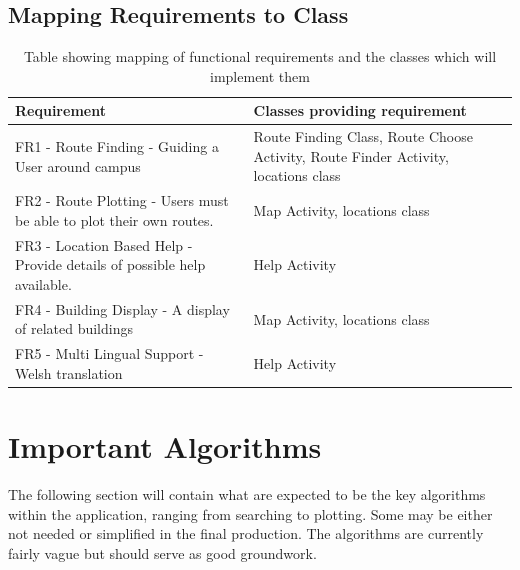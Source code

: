 \subsection{Mapping Requirements to Class}
\begin{center}
\begin{table}

    \begin{tabular}{ | p{7cm} | p{7cm} |}
    \hline
    Requirement & Classes providing requirement  \\ \hline
    FR1 - Route Finding - Guiding a User around campus & Route Finding Class, Route Choose Activity, Route Finder Activity, locations class  \\ \hline
    FR2 - Route Plotting - Users must be able to plot their own routes.& Map Activity, locations class  \\ \hline
   FR3 - Location Based Help - Provide details of possible help available. & Help Activity  \\ \hline
   FR4 - Building Display - A display of related buildings & Map Activity, locations class \\ \hline
   FR5 - Multi Lingual Support - Welsh translation & Help Activity \\ \hline
    \end{tabular}
    \caption[FR Mapping to classes]{Table showing mapping of functional requirements and the classes which will implement them}
\end{table}
\end{center}
\newpage
\section{Important Algorithms}
The following section will contain what are expected to be the key algorithms within the application, ranging from searching to plotting. Some may be either not needed or simplified in the final production. The algorithms are currently fairly vague but should serve as good groundwork. 
